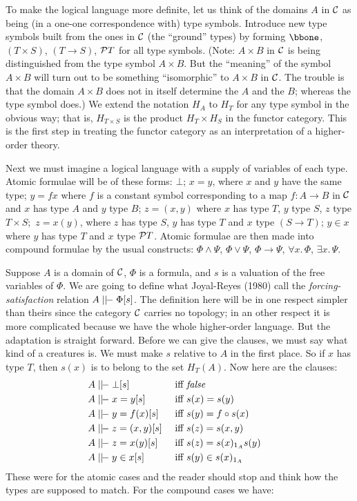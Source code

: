 To make the logical language more definite, let us think of the domains $A$ in $\C$ as being (in a one-one correspondence with) type symbols. Introduce new type symbols built from the ones
in $\C$ (the ``ground'' types) by forming $\bbone$, $(T \times S)$, $(T\to S)$, $\P T$ for all type symbols. (Note: $A \times B$ in $\C$ is being distinguished
from the type symbol $A \times B$. But the ``meaning'' of the symbol
$A\times B$ will turn out to be something ``isomorphic'' to $A\times B$ in $\C$. The trouble is that the domain $A \times B$ does not in itself determine the $A$ and the $B$; whereas the type symbol does.) We extend the notation $H_A$ to $H_T$ for any type symbol in the obvious way;
that is, $H_{T \times S}$ is the product $H_T \times H_S$ in the functor category. This is the first step in treating the functor category as an interpretation of a higher-order theory.

Next we must imagine a logical language with a supply of variables of each type. Atomic formulae will be of these
forms: $\bot$; $x = y$, where $x$ and $y$ have the same type; $y = f x$
where $f$ is a constant symbol corresponding to a map $f: A \to B$ in $\C$ and $x$ has type $A$ and $y$ type $B$; $z = (x,y)$ where $x$ has type $T$, $y$ type $S$, $z$ type $T \times S;$ $z = x(y)$, where $z$ has type $S$, $y$ has type $T$ and $x$ type $(S \to T)$; $y \in x$ where $y$ has type $T$ and $x$ type $\P T$. Atomic formulae are then made into compound formulae by the usual constructs: $\Phi \land \Psi$, $\Phi \lor \Psi$, $\Phi \to \Psi$, $\forall x. \, \Phi$, $\exists x. \, \Psi$.


Suppose $A$ is a domain of $\C$, $\Phi$ is a formula, and $s$ is a valuation of the free variables of $\Phi$. We are going to define what Joyal-Reyes (1980) call the {\it forcing-satisfaction} relation $A \mm \Phi[s]$. The definition here will be in one respect simpler
than theirs since the category $\C$ carries no topology; in an other respect it is more complicated because we have the whole higher-order language. But the adaptation is straight forward. Before we can give the clauses, we must say what kind of a creatures is. We must make $s$ relative to $A$ in the first place. So if $x$ has type $T$, then $s(x)$ is to belong to the set $H_T(A)$. Now here are the clauses:
\begin{align*}
  A & \mm \bot [s] & {\textrm{ iff }} & {\mathit { false }} &\\
  A & \mm x = y  [s] & {\textrm{ iff }} & s(x) = s(y) &\\
  A & \mm y = f(x) [s] & {\textrm{ iff }} & s(y) = f \comp s(x) &\\
  A & \mm z = (x,y) [s] & {\textrm{ iff }} & s(z) = s(x,y) &\\
  A & \mm z = x(y) [s] & {\textrm{ iff }} & s(z) = s(x)_{\id_A} s(y) &\\
  A & \mm y \in x [s] & {\textrm{ iff }} & s(y) \in s(x)_{\id_A} &
\end{align*}
These were for the atomic cases and the reader should stop and think how the types are supposed to match. For the compound cases we have:


